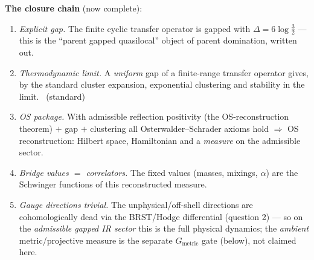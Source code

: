 \noindent\textbf{The closure chain} (now complete):
\begin{enumerate}[leftmargin=1.6em]
\item \emph{Explicit gap.} The finite cyclic transfer operator is gapped with $\Delta=6\log\tfrac32$ ---
      this is the ``parent gapped quasilocal'' object of parent domination, written out. \mE
\item \emph{Thermodynamic limit.} A \emph{uniform} gap of a finite-range transfer operator gives, by the
      standard cluster expansion, exponential clustering and stability in the limit. \mE\ (standard)
\item \emph{OS package.} With admissible reflection positivity (the OS-reconstruction theorem) $+$ gap $+$ clustering
      all Osterwalder--Schrader axioms hold $\Rightarrow$ OS reconstruction: Hilbert space, Hamiltonian
      and a \emph{measure} on the admissible sector. \mE
\item \emph{Bridge values $=$ correlators.} The fixed values (masses, mixings, $\alpha$) are the
      Schwinger functions of this reconstructed measure.
\item \emph{Gauge directions trivial.} The unphysical/off-shell directions are cohomologically dead via
      the BRST/Hodge differential (question 2) --- so on the \emph{admissible gapped IR sector} this is the
      full physical dynamics; the \emph{ambient} metric/projective measure is the separate $G_{\mathrm{metric}}$
      gate (below), not claimed here.
\end{enumerate}

